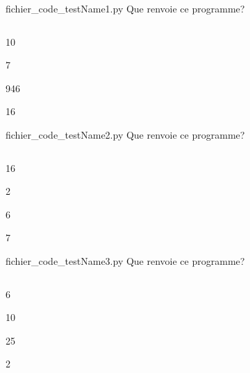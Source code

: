 \begin{multi}
      {fichier_code_testName1.py}
      Que renvoie ce programme?
      \inputminted{python}{fichier_code_testName1.py}
            \item*10
            \item7
            \item946
            \item16
    \end{multi}
\begin{multi}
      {fichier_code_testName2.py}
      Que renvoie ce programme?
      \inputminted{python}{fichier_code_testName2.py}
            \item*16
            \item2
            \item6
            \item7
    \end{multi}
\begin{multi}
      {fichier_code_testName3.py}
      Que renvoie ce programme?
      \inputminted{python}{fichier_code_testName3.py}
            \item*6
            \item10
            \item25
            \item2
    \end{multi}

    